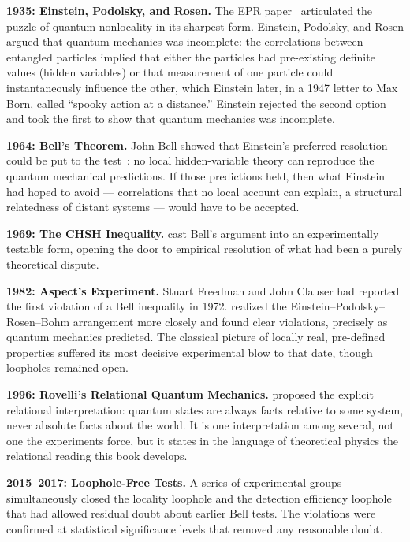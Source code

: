 \textbf{1935: Einstein, Podolsky, and Rosen.}
The EPR paper~\citep{Einstein1935EPR} articulated the puzzle of quantum
nonlocality in its sharpest form.
Einstein, Podolsky, and Rosen argued that quantum mechanics was incomplete: the
correlations between entangled particles implied that either the particles had
pre-existing definite values (hidden variables) or that measurement of one particle
could instantaneously influence the other, which Einstein later, in a 1947 letter
to Max Born, called ``spooky action at a distance.''
Einstein rejected the second option and took the first to show that quantum
mechanics was incomplete.

\textbf{1964: Bell's Theorem.}
John Bell showed that Einstein's preferred resolution could be put to the
test~\citep{Bell1964}: no local hidden-variable theory can reproduce the quantum
mechanical predictions.
If those predictions held, then what Einstein had hoped to avoid --- correlations
that no local account can explain, a structural relatedness of distant
systems --- would have to be accepted.

\textbf{1969: The CHSH Inequality.}
\citet{CHSH1969} cast Bell's argument into an experimentally testable form,
opening the door to empirical resolution of what had been a purely theoretical
dispute.

\textbf{1982: Aspect's Experiment.}
Stuart Freedman and John Clauser had reported the first violation of a Bell
inequality in 1972.
\citet{Aspect1982} realized the Einstein--Podolsky--Rosen--Bohm arrangement
more closely and found clear violations, precisely as quantum mechanics
predicted.
The classical picture of locally real, pre-defined properties suffered its most
decisive experimental blow to that date, though loopholes remained open.

\textbf{1996: Rovelli's Relational Quantum Mechanics.}
\citet{Rovelli1996} proposed the explicit relational interpretation: quantum states
are always facts relative to some system, never absolute facts about the world.
It is one interpretation among several, not one the experiments force, but it
states in the language of theoretical physics the relational reading this book
develops.

\textbf{2015--2017: Loophole-Free Tests.}
A series of experimental groups simultaneously closed the locality loophole and
the detection efficiency loophole that had allowed residual doubt about earlier Bell
tests.
The violations were confirmed at statistical significance levels that removed any
reasonable doubt.

